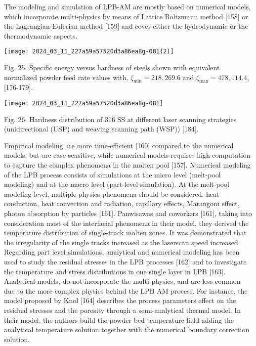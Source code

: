 \documentclass[10pt]{article}
\begin{document}
The modeling and simulation of LPB-AM are mostly based on numerical models, which incorporate multi-physics by means of Lattice Boltzmann method [158] or the Lagrangian-Eulerian method [159] and cover either the hydrodynamic or the thermodynamic aspects.

\begin{center}
\texttt{[image: 2024\_03\_11\_227a59a57520d3a86ea8g-081(2)]}
\end{center}

Fig. 25. Specific energy versus hardness of steels shown with equivalent normalized powder feed rate values with, $\zeta_{\min }=218,269.6$ and $\zeta_{\max }=478,114.4$, [176-179].

\begin{center}
\texttt{[image: 2024\_03\_11\_227a59a57520d3a86ea8g-081]}
\end{center}

Fig. 26. Hardness distribution of 316 SS at different laser scanning strategies (unidirectional (USP) and weaving scanning path (WSP)) [184].

Empirical modeling are more time-efficient [160] compared to the numerical models, but are case sensitive, while numerical models requires high computation to capture the complex phenomena in the molten pool [157]. Numerical modeling of the LPB process consists of simulations at the micro level (melt-pool modeling) and at the macro level (part-level simulation). At the melt-pool modeling level, multiple physics phenomena should be considered: heat conduction, heat convection and radiation, capillary effects, Marangoni effect, photon absorption by particles [161]. Panwisawas and coworkers [161], taking into consideration most of the interfacial phenomena in their model, they derived the temperature distribution of single-track molten zones. It was demonstrated that the irregularity of the single tracks increased as the laserscan speed increased. Regarding part level simulations, analytical and numerical modeling has been used to study the residual stresses in the LPB processes [162] and to investigate the temperature and stress distributions in one single layer in LPB [163]. Analytical models, do not incorporate the multi-physics, and are less common due to the more complex physics behind the LPB AM process. For instance, the model proposed by Knol [164] describes the process parameters effect on the residual stresses and the porosity through a semi-analytical thermal model. In their model, the authors build the powder bed temperature field adding the analytical temperature solution together with the numerical boundary correction solution.
\end{document}

